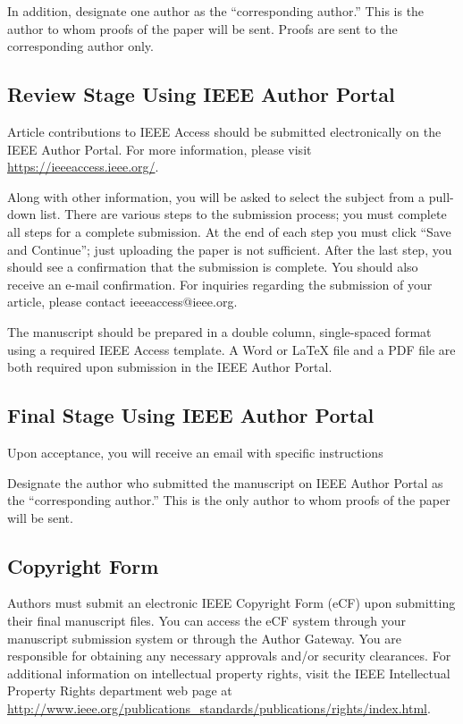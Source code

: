 \documentclass{ieeeaccess}
\begin{document}
In addition, designate one author as the ``corresponding author.'' This is the
author to whom proofs of the paper will be sent. Proofs are sent to the
corresponding author only.

\subsection{Review Stage Using IEEE Author Portal}
Article contributions to IEEE Access should be submitted electronically on the
IEEE Author Portal. For more information, please visit
\underline{https://ieeeaccess.ieee.org/}.

Along with other information, you will be asked to select the subject from a
pull-down list. There are various steps to the submission process; you must
complete all steps for a complete submission. At the end of each step you must
click ``Save and Continue''; just uploading the paper is not sufficient. After
the last step, you should see a confirmation that the submission is complete.
You should also receive an e-mail confirmation. For inquiries regarding the
submission of your article, please contact ieeeaccess@ieee.org.

The manuscript should be prepared in a double column, single-spaced format
using a required IEEE Access template. A Word or LaTeX file and a PDF file are
both required upon submission in the IEEE Author Portal.

\subsection{Final Stage Using IEEE Author Portal}
Upon acceptance, you will receive an email with specific instructions

Designate the author who submitted the manuscript on IEEE Author Portal as the
``corresponding author.'' This is the only author to whom proofs of the paper
will be sent.

\subsection{Copyright Form}
Authors must submit an electronic IEEE Copyright Form (eCF) upon submitting
their final manuscript files. You can access the eCF system through your
manuscript submission system or through the Author Gateway. You are responsible
for obtaining any necessary approvals and/or security clearances. For
additional information on intellectual property rights, visit the IEEE
Intellectual Property Rights department web page at
\underline{http://www.ieee.org/publications\_standards/publications/}\break\underline{rights/index.html}.
\end{document}
